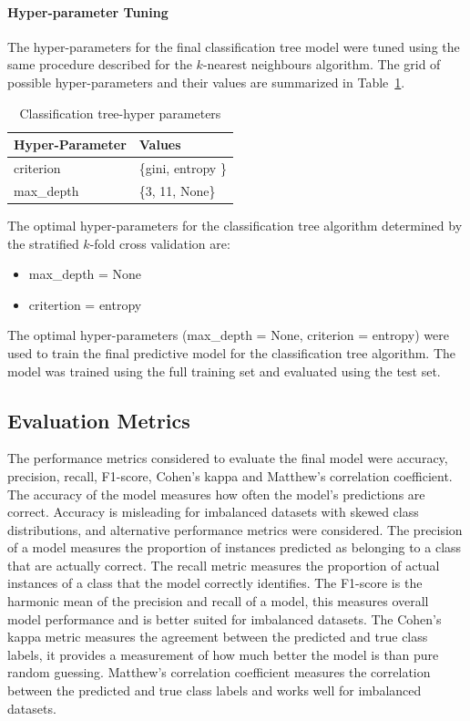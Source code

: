 \documentclass[conference]{IEEEtran}
\begin{document}
	\paragraph{Hyper-parameter Tuning}
	The hyper-parameters for the final classification tree model were tuned using the same procedure described for the $k$-nearest neighbours algorithm. The grid of possible hyper-parameters and their values are summarized in Table~\ref{tab:ct_param}.
	
	\begin{table}[htbp]
		\caption{Classification tree-hyper parameters}
		\label{tab:ct_param}
		\begin{center}
			\begin{tabular}{|l|l|}
				\hline
				\textbf{Hyper-Parameter} & \textbf{Values} \\
				\hline
				criterion & \{gini, entropy \} \\
				\hline
				max\_depth & \{3, 11, None\} \\
				\hline
			\end{tabular}
		\end{center}
	\end{table}
	
	The optimal hyper-parameters for the classification tree algorithm determined by the stratified $k$-fold cross validation are:
	\begin{itemize}
		\item max\_depth = None
		\item critertion = entropy
	\end{itemize}
	
	The optimal hyper-parameters (max\_depth = None, criterion = entropy) were used to train the final predictive model for the classification tree algorithm. The model was trained using the full training set and evaluated using the test set.
	
	\subsection{Evaluation Metrics}
	The performance metrics considered to evaluate the final model were accuracy, precision, recall, F1-score, Cohen's kappa and Matthew's correlation coefficient. The accuracy of the model measures how often the model's predictions are correct. Accuracy is misleading for imbalanced datasets with skewed class distributions, and alternative performance metrics were considered. The precision of a model measures the proportion of instances predicted as belonging to a class that are actually correct. The recall metric measures the proportion of actual instances of a class that the model correctly identifies. The F1-score is the harmonic mean of the precision and recall of a model, this measures overall model performance and is better suited for imbalanced datasets. The Cohen's kappa metric measures the agreement between the predicted and true class labels, it provides a measurement of how much better the model is than pure random guessing. Matthew's correlation coefficient measures the correlation between the predicted and true class labels and works well for imbalanced datasets.
	
\end{document}
